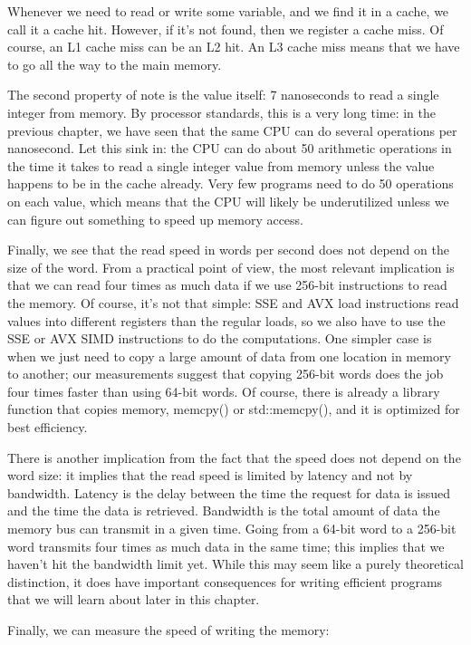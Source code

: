 Whenever we need to read or write some variable, and we find it in a cache, we call it a cache hit. However, if it's not found, then we register a cache miss. Of course, an L1 cache miss can be an L2 hit. An L3 cache miss means that we have to go all the way to the main memory.

The second property of note is the value itself: 7 nanoseconds to read a single integer from memory. By processor standards, this is a very long time: in the previous chapter, we have seen that the same CPU can do several operations per nanosecond. Let this sink in: the CPU can do about 50 arithmetic operations in the time it takes to read a single integer value from memory unless the value happens to be in the cache already. Very few programs need to do 50 operations on each value, which means that the CPU will likely be underutilized unless we can figure out something to speed up memory access.

Finally, we see that the read speed in words per second does not depend on the size of the word. From a practical point of view, the most relevant implication is that we can read four times as much data if we use 256-bit instructions to read the memory. Of course, it's not that simple: SSE and AVX load instructions read values into different registers than the regular loads, so we also have to use the SSE or AVX SIMD instructions to do the computations. One simpler case is when we just need to copy a large amount of data from one location in memory to another; our measurements suggest that copying 256-bit words does the job four times faster than using 64-bit words. Of course, there is already a library function that copies memory, memcpy() or std::memcpy(), and it is optimized for best efficiency.

There is another implication from the fact that the speed does not depend on the word size: it implies that the read speed is limited by latency and not by bandwidth. Latency is the delay between the time the request for data is issued and the time the data is retrieved. Bandwidth is the total amount of data the memory bus can transmit in a given time. Going from a 64-bit word to a 256-bit word transmits four times as much data in the same time; this implies that we haven't hit the bandwidth limit yet. While this may seem like a purely theoretical distinction, it does have important consequences for writing efficient programs that we will learn about later in this chapter.

Finally, we can measure the speed of writing the memory:

